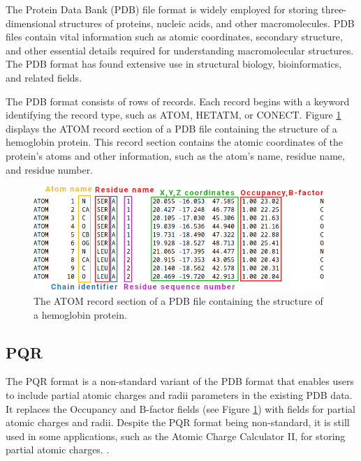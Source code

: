 \documentclass[
  digital,     %
  oneside,     %
  nosansbold,  %
  nocolorbold, %
  lof,         %
  lot,         %
]{fithesis4}
\begin{document}
The Protein Data Bank (PDB) file format is widely employed for storing three-dimensional structures of proteins, nucleic acids, and other macromolecules. PDB files contain vital information such as atomic coordinates, secondary structure, and other essential details required for understanding macromolecular structures. The PDB format has found extensive use in structural biology, bioinformatics, and related fields. \cite{pdb101}

The PDB format consists of rows of records. Each record begins with a keyword identifying the record type, such as ATOM, HETATM, or CONECT. Figure \ref{fig:pdb} displays the ATOM record section of a PDB file containing the structure of a hemoglobin protein. This record section contains the atomic coordinates of the protein's atoms and other information, such as the atom's name, residue name, and residue number. \cite{chimera_pqrfile}

\begin{figure}[htbp]
  \begin{center}
    \includegraphics[width=11cm]{figures/pdb_format.png}
  \end{center}
  \caption[ATOM record of PDB file.]{The ATOM record section of a PDB file containing the structure of a hemoglobin protein.}
  \label{fig:pdb}
\end{figure}

\subsection{PQR}
\label{subsection:pqr}

The PQR format is a non-standard variant of the PDB format that enables users to include partial atomic charges and radii parameters in the existing PDB data. It replaces the Occupancy and B-factor fields (see Figure \ref{fig:pdb}) with fields for partial atomic charges and radii. \cite{pqrfile,apbs_pqrfile} Despite the PQR format being non-standard, it is still used in some applications, such as the Atomic Charge Calculator II, for storing partial atomic charges. \cite{racek2020acc2}.
\end{document}

